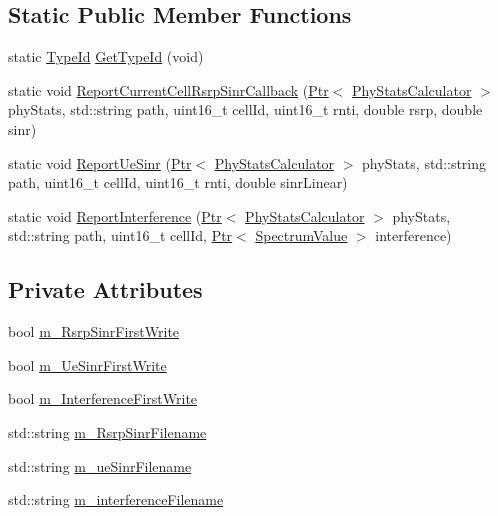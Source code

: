 \subsection*{Static Public Member Functions}
\begin{DoxyCompactItemize}
\item 
static \hyperlink{classns3_1_1TypeId}{Type\+Id} \hyperlink{classns3_1_1PhyStatsCalculator_acad1db7c5fc4a0dca436ea6221d3a6a3}{Get\+Type\+Id} (void)
\item 
static void \hyperlink{classns3_1_1PhyStatsCalculator_a8a4742442edf9989f4ec2a68563c5706}{Report\+Current\+Cell\+Rsrp\+Sinr\+Callback} (\hyperlink{classns3_1_1Ptr}{Ptr}$<$ \hyperlink{classns3_1_1PhyStatsCalculator}{Phy\+Stats\+Calculator} $>$ phy\+Stats, std\+::string path, uint16\+\_\+t cell\+Id, uint16\+\_\+t rnti, double rsrp, double sinr)
\item 
static void \hyperlink{classns3_1_1PhyStatsCalculator_a42a54459bcfaeffa2ab9702e11c2688a}{Report\+Ue\+Sinr} (\hyperlink{classns3_1_1Ptr}{Ptr}$<$ \hyperlink{classns3_1_1PhyStatsCalculator}{Phy\+Stats\+Calculator} $>$ phy\+Stats, std\+::string path, uint16\+\_\+t cell\+Id, uint16\+\_\+t rnti, double sinr\+Linear)
\item 
static void \hyperlink{classns3_1_1PhyStatsCalculator_a0e9e1a18b7069a3a46e339ba7a4a1b32}{Report\+Interference} (\hyperlink{classns3_1_1Ptr}{Ptr}$<$ \hyperlink{classns3_1_1PhyStatsCalculator}{Phy\+Stats\+Calculator} $>$ phy\+Stats, std\+::string path, uint16\+\_\+t cell\+Id, \hyperlink{classns3_1_1Ptr}{Ptr}$<$ \hyperlink{classns3_1_1SpectrumValue}{Spectrum\+Value} $>$ interference)
\end{DoxyCompactItemize}
\subsection*{Private Attributes}
\begin{DoxyCompactItemize}
\item 
bool \hyperlink{classns3_1_1PhyStatsCalculator_a46b685dffdee552555c7cfafe4427324}{m\+\_\+\+Rsrp\+Sinr\+First\+Write}
\item 
bool \hyperlink{classns3_1_1PhyStatsCalculator_a07168e92564d320f8bdd827cf4a5b99d}{m\+\_\+\+Ue\+Sinr\+First\+Write}
\item 
bool \hyperlink{classns3_1_1PhyStatsCalculator_a0b10c7dc6562ef4dbb3e06448420bb33}{m\+\_\+\+Interference\+First\+Write}
\item 
std\+::string \hyperlink{classns3_1_1PhyStatsCalculator_acf3d788baf89a45f2cdd0f186b252a8d}{m\+\_\+\+Rsrp\+Sinr\+Filename}
\item 
std\+::string \hyperlink{classns3_1_1PhyStatsCalculator_a5388808a7e5faeb47c716c85ce8183fd}{m\+\_\+ue\+Sinr\+Filename}
\item 
std\+::string \hyperlink{classns3_1_1PhyStatsCalculator_a48d0dac94f8e067b63c06efed42a7429}{m\+\_\+interference\+Filename}
\end{DoxyCompactItemize}
